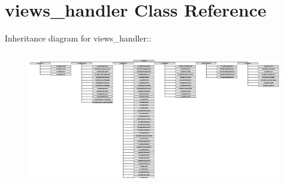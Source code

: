 \hypertarget{classviews__handler}{
\section{views\_\-handler Class Reference}
\label{classviews__handler}
}
Inheritance diagram for views\_\-handler::\begin{figure}[H]
\begin{center}
\leavevmode
\includegraphics[height=5.9545cm]{classviews__handler}
\end{center}
\end{figure}
